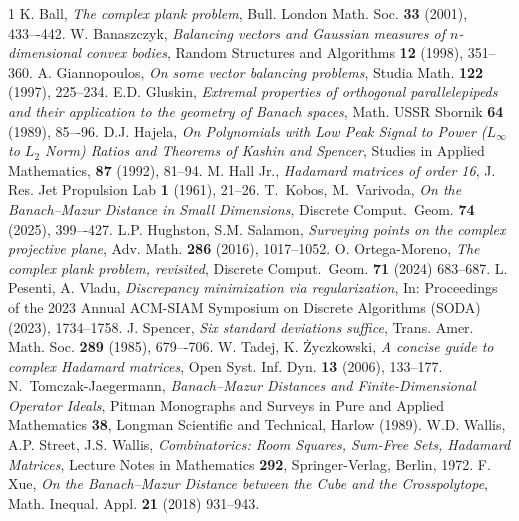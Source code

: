\documentclass[12pt, a4paper]{article}
\theoremstyle{plain} %
\theoremstyle{definition} %
\theoremstyle{remark} %
\begin{document}
\begin{thebibliography}{1}
 K. Ball, \emph{The complex plank problem}, Bull. London Math. Soc. \textbf{33} (2001), 433–-442.
 W. Banaszczyk, \emph{Balancing vectors and Gaussian measures of $n$-dimensional convex bodies}, Random Structures and Algorithms \textbf{12} (1998), 351--360.
 A. Giannopoulos, \emph{On some vector balancing problems}, Studia Math. \textbf{122} (1997), 225--234.
 E.D. Gluskin, \emph{Extremal properties of orthogonal parallelepipeds and their application to the geometry of Banach spaces}, Math. USSR Sbornik \textbf{64} (1989), 85–-96.
 D.J. Hajela, \emph{On Polynomials with Low Peak Signal to Power ($L_{\infty}$ to $L_2$ Norm) Ratios and Theorems of Kashin and Spencer}, Studies in Applied Mathematics, \textbf{87} (1992), 81--94.
 M. Hall Jr., \emph{Hadamard matrices of order 16}, J. Res. Jet Propulsion Lab \textbf{1} (1961), 21--26.
 T.~Kobos, M.~Varivoda, \emph{On the Banach–Mazur Distance in Small Dimensions}, Discrete Comput.~Geom. \textbf{74} (2025), 399–-427.
 L.P. Hughston, S.M. Salamon, \emph{Surveying points on the complex projective plane}, Adv. Math. \textbf{286} (2016), 1017--1052.
 O. Ortega-Moreno, \emph{The complex plank problem, revisited}, Discrete Comput.~Geom. \textbf{71} (2024) 683--687.
 L. Pesenti, A. Vladu, \emph{Discrepancy minimization via regularization}, In: Proceedings of the 2023 Annual ACM-SIAM Symposium on Discrete Algorithms (SODA) (2023), 1734--1758.
 J. Spencer, \emph{Six standard deviations suffice}, Trans. Amer. Math. Soc. \textbf{289} (1985), 679–-706.
 W. Tadej, K. Życzkowski, \emph{A concise guide to complex Hadamard matrices}, Open Syst. Inf. Dyn. \textbf{13} (2006), 133--177.
 N.~Tomczak-Jaegermann, \emph{Banach--Mazur Distances and Finite-Dimensional Operator Ideals}, Pitman Monographs and Surveys in Pure and Applied Mathematics \textbf{38}, Longman Scientific and Technical, Harlow (1989).
 W.D. Wallis, A.P. Street, J.S. Wallis, \emph{Combinatorics: Room Squares, Sum-Free Sets, Hadamard Matrices}, Lecture Notes in Mathematics \textbf{292}, Springer-Verlag, Berlin, 1972.
 F. Xue, \emph{On the Banach--Mazur Distance between the Cube and the Crosspolytope}, Math. Inequal. Appl. \textbf{21} (2018) 931--943.


\end{thebibliography}
\end{document}
